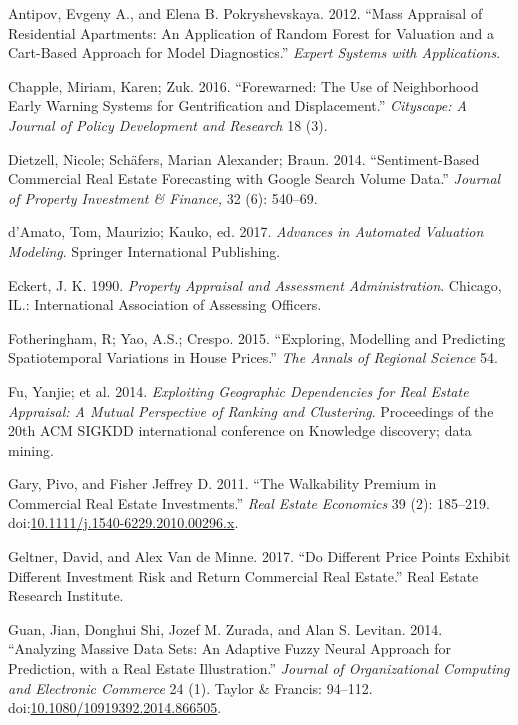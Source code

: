 \documentclass[]{article}
\begin{document}
\hypertarget{ref-antipov12}{}
Antipov, Evgeny A., and Elena B. Pokryshevskaya. 2012. ``Mass Appraisal
of Residential Apartments: An Application of Random Forest for Valuation
and a Cart-Based Approach for Model Diagnostics.'' \emph{Expert Systems
with Applications}.

\hypertarget{ref-Chapple2016}{}
Chapple, Miriam, Karen; Zuk. 2016. ``Forewarned: The Use of Neighborhood
Early Warning Systems for Gentrification and Displacement.''
\emph{Cityscape: A Journal of Policy Development and Research} 18 (3).

\hypertarget{ref-Dietzell2014}{}
Dietzell, Nicole; Schäfers, Marian Alexander; Braun. 2014.
``Sentiment-Based Commercial Real Estate Forecasting with Google Search
Volume Data.'' \emph{Journal of Property Investment \& Finance,} 32 (6):
540--69.

\hypertarget{ref-Springer2017}{}
d'Amato, Tom, Maurizio; Kauko, ed. 2017. \emph{Advances in Automated
Valuation Modeling}. Springer International Publishing.

\hypertarget{ref-Eckert1990}{}
Eckert, J. K. 1990. \emph{Property Appraisal and Assessment
Administration}. Chicago, IL.: International Association of Assessing
Officers.

\hypertarget{ref-Fotheringham2015}{}
Fotheringham, R; Yao, A.S.; Crespo. 2015. ``Exploring, Modelling and
Predicting Spatiotemporal Variations in House Prices.'' \emph{The Annals
of Regional Science} 54.

\hypertarget{ref-Fu2014}{}
Fu, Yanjie; et al. 2014. \emph{Exploiting Geographic Dependencies for
Real Estate Appraisal: A Mutual Perspective of Ranking and Clustering}.
Proceedings of the 20th ACM SIGKDD international conference on Knowledge
discovery; data mining.

\hypertarget{ref-Pivo2011}{}
Gary, Pivo, and Fisher Jeffrey D. 2011. ``The Walkability Premium in
Commercial Real Estate Investments.'' \emph{Real Estate Economics} 39
(2): 185--219.
doi:\href{https://doi.org/10.1111/j.1540-6229.2010.00296.x}{10.1111/j.1540-6229.2010.00296.x}.

\hypertarget{ref-Geltner2017}{}
Geltner, David, and Alex Van de Minne. 2017. ``Do Different Price Points
Exhibit Different Investment Risk and Return Commercial Real Estate.''
Real Estate Research Institute.

\hypertarget{ref-Guan2014}{}
Guan, Jian, Donghui Shi, Jozef M. Zurada, and Alan S. Levitan. 2014.
``Analyzing Massive Data Sets: An Adaptive Fuzzy Neural Approach for
Prediction, with a Real Estate Illustration.'' \emph{Journal of
Organizational Computing and Electronic Commerce} 24 (1). Taylor \&
Francis: 94--112.
doi:\href{https://doi.org/10.1080/10919392.2014.866505}{10.1080/10919392.2014.866505}.
\end{document}
